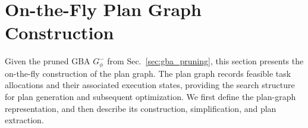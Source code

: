 \documentclass[lettersize,journal]{IEEEtran}
\theoremstyle{italiclemma}
\theoremstyle{italiclemma}
\theoremstyle{definition}
\begin{document}
\section{On-the-Fly Plan Graph Construction}
\label{sec:plan_graph_construction}

Given the pruned GBA $G_\phi^{-}$ from Sec.~\ref{sec:gba_pruning}, this section presents the on-the-fly construction of the plan graph. The plan graph records feasible task allocations and their associated execution states, providing the search structure for plan generation and subsequent optimization. We first define the plan-graph representation, and then describe its construction, simplification, and plan extraction.



\end{document}
